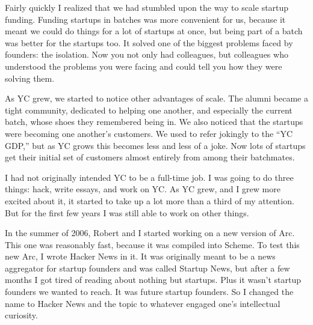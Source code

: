 Fairly quickly I realized that we had stumbled upon the way to scale
startup funding. Funding startups in batches was more convenient for us,
because it meant we could do things for a lot of startups at once, but
being part of a batch was better for the startups too. It solved one of
the biggest problems faced by founders: the isolation. Now you not only
had colleagues, but colleagues who understood the problems you were
facing and could tell you how they were solving them.

As YC grew, we started to notice other advantages of scale. The alumni
became a tight community, dedicated to helping one another, and
especially the current batch, whose shoes they remembered being in. We
also noticed that the startups were becoming one another's customers. We
used to refer jokingly to the ``YC GDP,'' but as YC grows this becomes
less and less of a joke. Now lots of startups get their initial set of
customers almost entirely from among their batchmates.

I had not originally intended YC to be a full-time job. I was going to
do three things: hack, write essays, and work on YC. As YC grew, and I
grew more excited about it, it started to take up a lot more than a
third of my attention. But for the first few years I was still able to
work on other things.

In the summer of 2006, Robert and I started working on a new version of
Arc. This one was reasonably fast, because it was compiled into Scheme.
To test this new Arc, I wrote Hacker News in it. It was originally meant
to be a news aggregator for startup founders and was called Startup
News, but after a few months I got tired of reading about nothing but
startups. Plus it wasn't startup founders we wanted to reach. It was
future startup founders. So I changed the name to Hacker News and the
topic to whatever engaged one's intellectual curiosity.

